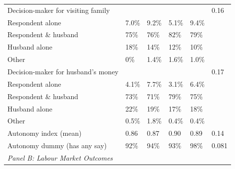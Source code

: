\documentclass{article}
\begin{document}
\begin{landscape}
\begin{longtable}{@{}p{6cm}p{2.5cm}p{2.5cm}p{2.5cm}p{2.5cm}p{1.5cm}@{}}
\quad Decision-maker for visiting family     &        &        &        &        & 0.16  \\
\quad\quad Respondent alone                  & 7.0\%  & 9.2\%  & 5.1\%  & 9.4\%  &       \\
\quad\quad Respondent \& husband             & 75\%   & 76\%   & 82\%   & 79\%   &       \\
\quad\quad Husband alone                     & 18\%   & 14\%   & 12\%   & 10\%   &       \\
\quad\quad Other                             & 0\%    & 1.4\%  & 1.6\%  & 1.0\%  &       \\[4pt]

\quad Decision-maker for husband's money     &        &        &        &        & 0.17  \\
\quad\quad Respondent alone                  & 4.1\%  & 7.7\%  & 3.1\%  & 6.4\%  &       \\
\quad\quad Respondent \& husband             & 73\%   & 71\%   & 79\%   & 75\%   &       \\
\quad\quad Husband alone                     & 22\%   & 19\%   & 17\%   & 18\%   &       \\
\quad\quad Other                             & 0.5\%  & 1.8\%  & 0.4\%  & 0.4\%  &       \\[4pt]

\quad Autonomy index (mean)                  & 0.86   & 0.87   & 0.90   & 0.89   & 0.14  \\
\quad Autonomy dummy (has any say)           & 92\%   & 94\%   & 93\%   & 98\%   & 0.081 \\[6pt]

\multicolumn{6}{l}{\textit{Panel B: Labour Market Outcomes}} \\[2pt]


\end{longtable}
\end{landscape}
\end{document}
